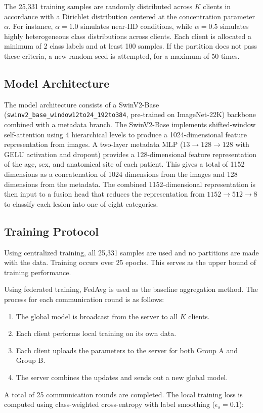 \documentclass{ieeeaccess}
\begin{document}
The 25,331 training samples are randomly distributed across $K$ clients in accordance with a Dirichlet distribution centered at the concentration parameter $\alpha$. For instance, $\alpha = 1.0$ simulates near-IID conditions, while $\alpha = 0.5$ simulates highly heterogeneous class distributions across clients. Each client is allocated a minimum of 2 class labels and at least 100 samples. If the partition does not pass these criteria, a new random seed is attempted, for a maximum of 50 times.

\subsection{Model Architecture}

The model architecture consists of a SwinV2-Base (\texttt{swinv2\_base\_window12to24\_192to384}, pre-trained on ImageNet-22K) backbone combined with a metadata branch. The SwinV2-Base implements shifted-window self-attention using 4 hierarchical levels to produce a 1024-dimensional feature representation from images. A two-layer metadata MLP ($13 \to 128 \to 128$ with GELU activation and dropout) provides a 128-dimensional feature representation of the age, sex, and anatomical site of each patient. This gives a total of 1152 dimensions as a concatenation of 1024 dimensions from the images and 128 dimensions from the metadata. The combined 1152-dimensional representation is then input to a fusion head that reduces the representation from $1152 \to 512 \to 8$ to classify each lesion into one of eight categories.

\subsection{Training Protocol}

Using centralized training, all 25,331 samples are used and no partitions are made with the data. Training occurs over 25 epochs. This serves as the upper bound of training performance.

Using federated training, FedAvg is used as the baseline aggregation method. The process for each communication round is as follows:
\begin{enumerate}
    \item The global model is broadcast from the server to all $K$ clients.
    \item Each client performs local training on its own data.
    \item Each client uploads the parameters to the server for both Group A and Group B.
    \item The server combines the updates and sends out a new global model.
\end{enumerate}
A total of 25 communication rounds are completed. The local training loss is computed using class-weighted cross-entropy with label smoothing ($\epsilon_s = 0.1$):
\end{document}

